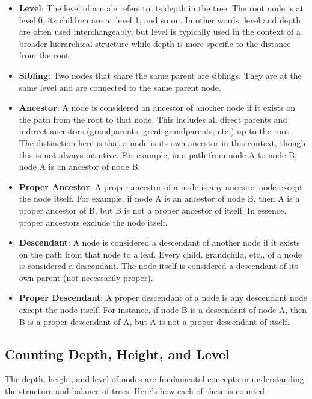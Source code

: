 \documentclass{book}
\begin{document}
\begin{itemize}
    \item \textbf{Level}: The level of a node refers to its depth in the tree. The root node is at level 0, its children are at level 1, and so on. In other words, level and depth are often used interchangeably, but level is typically used in the context of a broader hierarchical structure while depth is more specific to the distance from the root.
    \item \textbf{Sibling}: Two nodes that share the same parent are siblings. They are at the same level and are connected to the same parent node.
    \item \textbf{Ancestor}: A node is considered an ancestor of another node if it exists on the path from the root to that node. This includes all direct parents and indirect ancestors (grandparents, great-grandparents, etc.) up to the root. The distinction here is that a node is its own ancestor in this context, though this is not always intuitive. For example, in a path from node A to node B, node A is an ancestor of node B.
    \item \textbf{Proper Ancestor}: A proper ancestor of a node is any ancestor node except the node itself. For example, if node A is an ancestor of node B, then A is a proper ancestor of B, but B is not a proper ancestor of itself. In essence, proper ancestors exclude the node itself.
    \item \textbf{Descendant}: A node is considered a descendant of another node if it exists on the path from that node to a leaf. Every child, grandchild, etc., of a node is considered a descendant. The node itself is considered a descendant of its own parent (not necessarily proper).
    \item \textbf{Proper Descendant}: A proper descendant of a node is any descendant node except the node itself. For instance, if node B is a descendant of node A, then B is a proper descendant of A, but A is not a proper descendant of itself.
\end{itemize}

\subsection{Counting Depth, Height, and Level}

The depth, height, and level of nodes are fundamental concepts in understanding the structure and balance of trees. Here's how each of these is counted:
\end{document}
